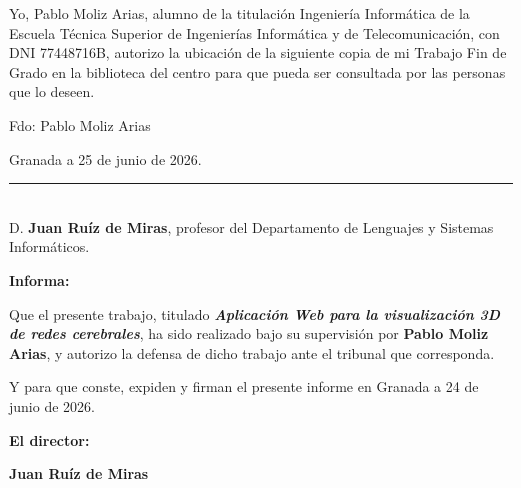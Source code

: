 \cleardoublepage

\thispagestyle{empty}

Yo, Pablo Moliz Arias, alumno de la titulación Ingeniería Informática de la Escuela
Técnica Superior de Ingenierías Informática y de Telecomunicación, con DNI 77448716B,
autorizo la ubicación de la siguiente copia de mi Trabajo Fin de Grado en la biblioteca del
centro para que pueda ser consultada por las personas que lo deseen.

\vspace{1cm}

\noindent Fdo: Pablo Moliz Arias

\vspace{2cm}

\noindent Granada a 25 de junio de 2026.

\cleardoublepage

\thispagestyle{empty}

\noindent\rule[-1ex]{\textwidth}{2pt}\\[4.5ex]

D. \textbf{Juan Ruíz de Miras}, profesor del Departamento de Lenguajes y Sistemas Informáticos.

\vspace{0.5cm}

\textbf{Informa:}

\vspace{0.5cm}

Que el presente trabajo, titulado \textit{\textbf{Aplicación Web para la visualización 3D de redes
cerebrales}}, ha sido realizado bajo su supervisión por \textbf{Pablo Moliz Arias}, y autorizo la
defensa de dicho trabajo ante el tribunal que corresponda.

\vspace{0.5cm}

Y para que conste, expiden y firman el presente informe en Granada a 24 de junio de 2026.

\vspace{1cm}

\textbf{El director: }

\vspace{5cm}

\noindent \textbf{Juan Ruíz de Miras}

%



